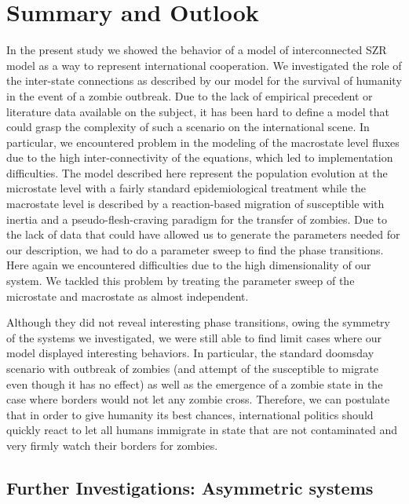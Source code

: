 \documentclass[11pt]{article} %
\begin{document}
\newpage
\section{Summary and Outlook}\indent

In the present study we showed the behavior of a model of interconnected SZR model as a way to represent international cooperation. We investigated the role of the inter-state connections as described by our model for the survival of humanity in the event of a zombie outbreak. Due to the lack of empirical precedent or literature data available on the subject, it has been hard to define a model that could grasp the complexity of such a scenario on the international scene. In particular, we encountered problem in the modeling of the macrostate level fluxes due to the high inter-connectivity of the equations, which led to implementation difficulties. The model described here represent the population evolution at the microstate level with a fairly standard epidemiological treatment while the macrostate level is described by a reaction-based migration of susceptible with inertia and a pseudo-flesh-craving paradigm for the transfer of zombies. Due to the lack of data that could have allowed us to generate the parameters needed for our description, we had to do a parameter sweep to find the phase transitions. Here again we encountered difficulties due to the high dimensionality of our system. We tackled this problem by treating the parameter sweep of the microstate and macrostate as almost independent. 

Although they did not reveal interesting phase transitions, owing the symmetry of the systems we investigated, we were still able to find limit cases where our model displayed interesting behaviors. In particular, the standard doomsday scenario with outbreak of zombies (and attempt of the susceptible to migrate even though it has no effect) as well as the emergence of a zombie state in the case where borders would not let any zombie cross. Therefore, we can postulate that in order to give humanity its best chances, international politics should quickly react to let all humans immigrate in state that are not contaminated and very firmly watch their borders for zombies.
  
\subsection{Further Investigations: Asymmetric systems}\indent
\end{document}
